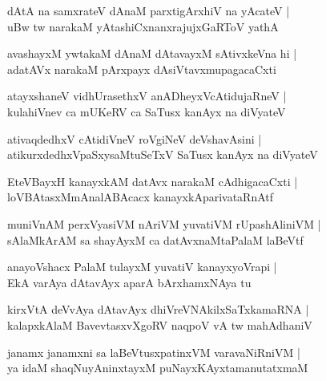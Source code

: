 \documentclass[twoside,12pt,openright]{book}
\newcounter{shloka}[chapter]
\begin{document}
\begin{shloka}%
dAtA na samxrateV dAnaM parxtigArxhiV na yAcateV |\\
uBw tw narakaM yAtashiCxnanxrajujxGaRToV yathA
\end{shloka}

\begin{shloka}%
avashayxM ywtakaM dAnaM dAtavayxM sAtivxkeVna hi |\\
adatAVx narakaM pArxpayx dAsiVtavxmupagacaCxti 
\end{shloka}

\begin{shloka}%
atayxshaneV vidhUrasethxV anADheyxVcAtidujaRneV |\\
kulahiVnev ca mUKeRV ca SaTusx kanAyx na diVyateV 
\end{shloka}

\begin{shloka}%
ativaqdedhxV cAtidiVneV roVgiNeV deVshavAsini |\\
atikurxdedhxVpaSxysaMtuSeTxV SaTusx kanAyx na diVyateV
\end{shloka}

\begin{shloka}%
EteVBayxH kanayxkAM datAvx narakaM cAdhigacaCxti |\\
loVBAtasxMmAnalABAcacx kanayxkAparivataRnAtf
\end{shloka}

\begin{shloka}%
muniVnAM perxVyasiVM nAriVM yuvatiVM rUpashAliniVM |\\
sAlaMkArAM sa shayAyxM ca datAvxnaMtaPalaM laBeVtf
\end{shloka}

\begin{shloka}%
anayoVshacx PalaM tulayxM yuvatiV kanayxyoVrapi |\\
EkA varAya dAtavAyx aparA bArxhamxNAya tu 
\end{shloka}

\begin{shloka}%
kirxVtA deVvAya dAtavAyx dhiVreVNAkilxSaTxkamaRNA |\\
kalapxkAlaM BavevtasxvXgoRV naqpoV vA tw mahAdhaniV 
\end{shloka}

\begin{shloka}%
janamx janamxni sa laBeVtusxpatinxVM varavaNiRniVM |\\
ya idaM shaqNuyAninxtayxM puNayxKAyxtamanutatxmaM 
\end{shloka}
\end{document}
